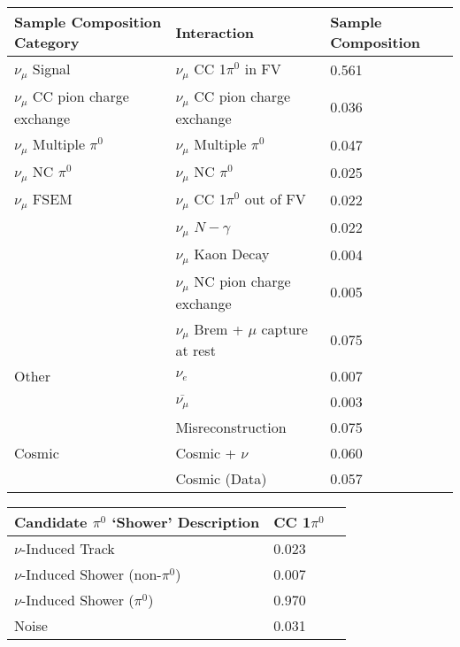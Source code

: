 \documentclass{article}
\begin{document}
\begin{table}[H]
\centering
{}
 \begin{tabular}{|l|l|l|}
 \hline
Sample Composition Category & Interaction & Sample Composition \\ [0.1ex] \hline
$\nu_\mu$ Signal & $\nu_\mu$ CC 1$\pi^0$ in FV & 0.561 \\ \hline
$\nu_\mu$ CC pion charge exchange & $\nu_\mu$ CC pion charge exchange & 0.036 \\ \hline
$\nu_\mu$ Multiple $\pi^0$ & $\nu_\mu$ Multiple $\pi^0$ & 0.047 \\ \hline
$\nu_\mu$ NC $\pi^0$ & $\nu_\mu$ NC $\pi^0$ & 0.025 \\ \hline
$\nu_\mu$ FSEM & $\nu_\mu$ CC 1$\pi^0$ out of FV & 0.022 \\
& $\nu_\mu$ $N-\gamma$ & 0.022 \\
& $\nu_\mu$ Kaon Decay & 0.004 \\
& $\nu_\mu$ NC pion charge exchange & 0.005 \\ 
&$\nu_\mu$ Brem + $\mu$ capture at rest & 0.075 \\ \hline
Other & $\nu_e$ &0.007 \\
&$\overline{\nu_\mu}$ & 0.003 \\
& Misreconstruction & 0.075 \\ \hline
Cosmic & Cosmic + $\nu$ & 0.060 \\
& Cosmic (Data) & 0.057 \\ \hline
\end{tabular}
\end{table}

\begin{table}[H]
\centering
{}
 \begin{tabular}{|l|l|l|}
 \hline
Candidate $\pi^0$ `Shower' Description & CC 1$\pi^0$ \\ [0.1ex] \hline
$\nu$-Induced Track & 0.023 \\ 
$\nu$-Induced Shower (non-$\pi^0$) & 0.007 \\ 
$\nu$-Induced Shower ($\pi^0$) & 0.970 \\ 
Noise & 0.031  \\ \hline
\end{tabular}
\end{table}
\end{document}
